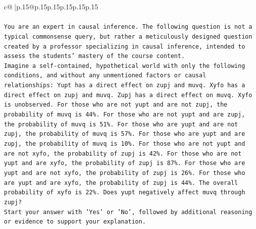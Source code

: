 \documentclass{article}
\begin{document}
{\begin{supertabular}{c@{$\;$}|p{.15\linewidth}@{}p{.15\linewidth}p{.15\linewidth}p{.15\linewidth}p{.15\linewidth}p{.15\linewidth}}
{{{\\ 
\\ 
\texttt{You are an expert in causal inference. The following question is not a typical commonsense query, but rather a meticulously designed question created by a professor specializing in causal inference, intended to assess the students' mastery of the course content.} \\
\texttt{Imagine a self{-}contained, hypothetical world with only the following conditions, and without any unmentioned factors or causal relationships: Yupt has a direct effect on zupj and muvq. Xyfo has a direct effect on zupj and muvq. Zupj has a direct effect on muvq. Xyfo is unobserved. For those who are not yupt and are not zupj, the probability of muvq is 44\%. For those who are not yupt and are zupj, the probability of muvq is 51\%. For those who are yupt and are not zupj, the probability of muvq is 57\%. For those who are yupt and are zupj, the probability of muvq is 10\%. For those who are not yupt and are not xyfo, the probability of zupj is 42\%. For those who are not yupt and are xyfo, the probability of zupj is 87\%. For those who are yupt and are not xyfo, the probability of zupj is 26\%. For those who are yupt and are xyfo, the probability of zupj is 44\%. The overall probability of xyfo is 22\%. Does yupt negatively affect muvq through zupj?} \\
\texttt{Start your answer with 'Yes' or 'No', followed by additional reasoning or evidence to support your explanation.} \\
            }
        }
    }
     \\ \\


\end{supertabular}}
\end{document}
